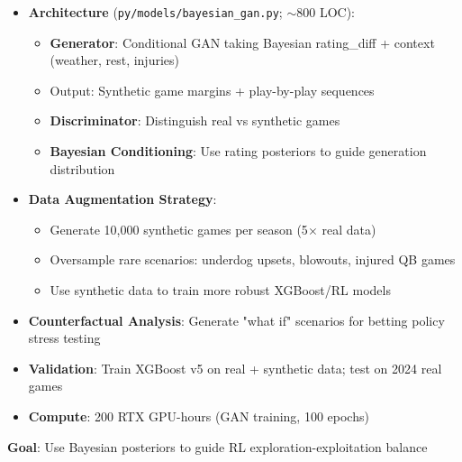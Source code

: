 \begin{itemize}
  \item {} \textbf{Architecture} (\texttt{py/models/bayesian\_gan.py}; $\sim$800 LOC):
  \begin{itemize}
    \item \textbf{Generator}: Conditional GAN taking Bayesian rating\_diff + context (weather, rest, injuries)
    \item Output: Synthetic game margins + play-by-play sequences
    \item \textbf{Discriminator}: Distinguish real vs synthetic games
    \item \textbf{Bayesian Conditioning}: Use rating posteriors to guide generation distribution
  \end{itemize}
  \item {} \textbf{Data Augmentation Strategy}:
  \begin{itemize}
    \item Generate 10,000 synthetic games per season (5$\times$ real data)
    \item Oversample rare scenarios: underdog upsets, blowouts, injured QB games
    \item Use synthetic data to train more robust XGBoost/RL models
  \end{itemize}
  \item {} \textbf{Counterfactual Analysis}: Generate "what if" scenarios for betting policy stress testing
  \item {} \textbf{Validation}: Train XGBoost v5 on real + synthetic data; test on 2024 real games
  \item \textbf{Compute}: 200 RTX GPU-hours (GAN training, 100 epochs)
\end{itemize}

\textbf{Goal}: Use Bayesian posteriors to guide RL exploration-exploitation balance

